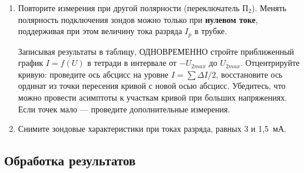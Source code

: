\begin{lab:task}
\begin{enumerate}
\item Повторите измерения при другой полярности (переключатель П$_2$). Менять полярность подключения зондов можно только при \textbf{нулевом токе}, поддерживая при этом величину тока разряда $I_{p}$ в трубке.

Записывая результаты в таблицу, ОДНОВРЕМЕННО стройте приближенный график $I=f(U)$  в тетради в интервале от $-U_{2 max}$ до $U_{2 max}$. Отцентрируйте кривую: проведите ось абсцисс на уровне $I=\sum \Delta I/2$, восстановите ось ординат из точки пересения кривой с новой осью абсцисс. Убедитесь, что можно провести асимптоты к участкам кривой при больших напряжениях. Если точек мало --- проведите дополнительные измерения.

\item Снимите зондовые характеристики при токах разряда, равных 3 и 1,5~мА.
 \end{enumerate}



\end{lab:task}

\subsection*{Обработка результатов}


